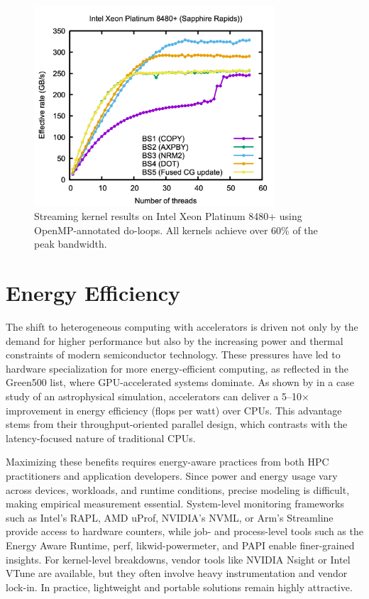 \documentclass[a4paper,12pt]{article}
\begin{document}
\begin{figure}[htbp]
  \centering
  \includegraphics[width=0.8\textwidth]{omp_intel_SPR} %
  \caption{Streaming kernel results on Intel Xeon Platinum 8480+ using OpenMP-annotated do-loops. All kernels achieve over 60\% of the peak bandwidth.}
  \label{fig:streaming_omp_sapphirerapids}
\end{figure}


\section{Energy Efficiency}

The shift to heterogeneous computing with accelerators is driven not only by the demand for higher performance but also by the increasing power and thermal constraints of modern semiconductor technology. These pressures have led to hardware specialization for more energy-efficient computing, as reflected in the Green500 list, where GPU-accelerated systems dominate. As shown by \cite{Cielo25} in a case study of an astrophysical simulation, accelerators can deliver a 5–10× improvement in energy efficiency (flops per watt) over CPUs. This advantage stems from their throughput-oriented parallel design, which contrasts with the latency-focused nature of traditional CPUs.

Maximizing these benefits requires energy-aware practices from both HPC practitioners and application developers. Since power and energy usage vary across devices, workloads, and runtime conditions, precise modeling is difficult, making empirical measurement essential. System-level monitoring frameworks such as Intel’s RAPL, AMD uProf, NVIDIA’s NVML, or Arm’s Streamline provide access to hardware counters, while job- and process-level tools such as the Energy Aware Runtime, perf, likwid-powermeter, and PAPI enable finer-grained insights. For kernel-level breakdowns, vendor tools like NVIDIA Nsight or Intel VTune are available, but they often involve heavy instrumentation and vendor lock-in. In practice, lightweight and portable solutions remain highly attractive.
\end{document}
